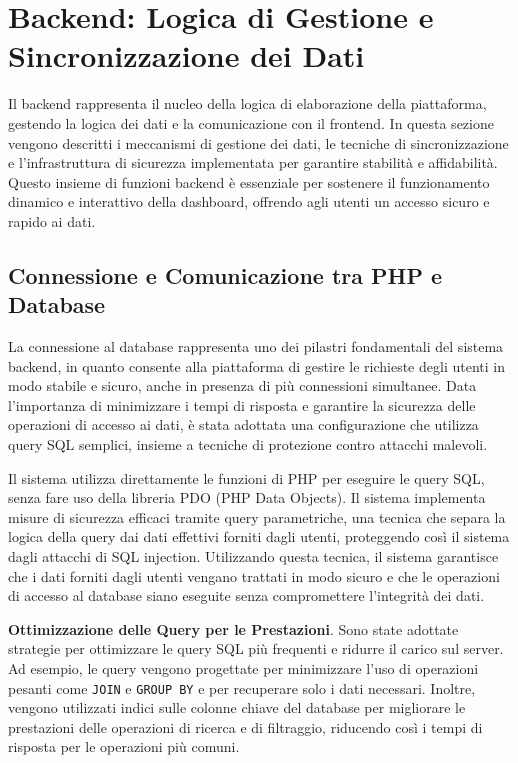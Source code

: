 \section{Backend: Logica di Gestione e Sincronizzazione dei Dati}

Il backend rappresenta il nucleo della logica di elaborazione della piattaforma, gestendo la logica dei dati e la comunicazione con il frontend. In questa sezione vengono descritti i meccanismi di gestione dei dati, le tecniche di sincronizzazione e l'infrastruttura di sicurezza implementata per garantire stabilità e affidabilità. Questo insieme di funzioni backend è essenziale per sostenere il funzionamento dinamico e interattivo della dashboard, offrendo agli utenti un accesso sicuro e rapido ai dati.


\subsection{Connessione e Comunicazione tra PHP e Database}

La connessione al database rappresenta uno dei pilastri fondamentali del sistema backend, in quanto consente alla piattaforma di gestire le richieste degli utenti in modo stabile e sicuro, anche in presenza di più connessioni simultanee. Data l’importanza di minimizzare i tempi di risposta e garantire la sicurezza delle operazioni di accesso ai dati, è stata adottata una configurazione che utilizza query SQL semplici, insieme a tecniche di protezione contro attacchi malevoli.

Il sistema utilizza direttamente le funzioni di PHP per eseguire le query SQL, senza fare uso della libreria PDO (PHP Data Objects). Il sistema implementa misure di sicurezza efficaci tramite query parametriche, una tecnica che separa la logica della query dai dati effettivi forniti dagli utenti, proteggendo così il sistema dagli attacchi di SQL injection. Utilizzando questa tecnica, il sistema garantisce che i dati forniti dagli utenti vengano trattati in modo sicuro e che le operazioni di accesso al database siano eseguite senza compromettere l'integrità dei dati.

\textbf{Ottimizzazione delle Query per le Prestazioni}. Sono state adottate strategie per ottimizzare le query SQL più frequenti e ridurre il carico sul server. Ad esempio, le query vengono progettate per minimizzare l'uso di operazioni pesanti come \texttt{JOIN} e \texttt{GROUP BY} e per recuperare solo i dati necessari. Inoltre, vengono utilizzati indici sulle colonne chiave del database per migliorare le prestazioni delle operazioni di ricerca e di filtraggio, riducendo così i tempi di risposta per le operazioni più comuni.

